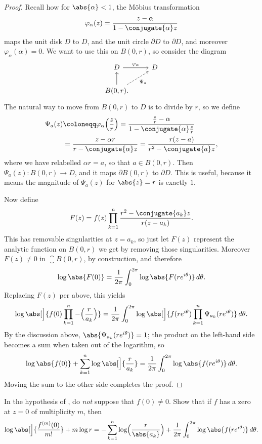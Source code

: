 \begin{proof}
	Recall how for $\abs{\alpha} < 1$, the Möbius transformation
	\[
		\varphi_\alpha(z) = \frac{z - \alpha}{1 - \conjugate{\alpha} z}
	\]
	maps the unit disk $D$ to $D$, and the unit circle $\partial D$ to $\partial D$, and moreover $\varphi_\alpha(\alpha) = 0$.
	We want to use this on $B(0, r)$, so consider the diagram
	\[
		\begin{tikzcd}
			D \arrow[r, "\varphi_\alpha"] & D \\
			B(0, r). \arrow[u] \arrow[ur, dashed, "\Psi_a"']
		\end{tikzcd}
	\]
	The natural way to move from $B(0, r)$ to $D$ is to divide by $r$, so we define
	\begin{align*}
		\Psi_a(z) &\coloneqq \varphi_\alpha\Bigl(\frac{z}{r}\Bigr) = \frac{\frac{z}{r} - \alpha}{1 - \conjugate{\alpha} \frac{z}{r}} \\
		&= \frac{z - \alpha r}{r - \conjugate{\alpha} z} = \frac{r(z - a)}{r^2 - \conjugate{a} z},
	\end{align*}
	where we have relabelled $\alpha r = a$, so that $a \in B(0, r)$.
	Then $\Psi_a(z) \colon B(0, r) \to D$, and it maps $\partial B(0, r)$ to $\partial D$.
	This is useful, because it means the magnitude of $\Psi_a(z)$ for $\abs{z} = r$ is exactly $1$.

	Now define
	\[
		F(z) = f(z) \prod_{k = 1}^n \frac{r^2 - \conjugate{a_k} z}{r(z - a_k)}.
	\]
	This has removable singularities at $z = a_k$, so just let $F(z)$ represent the analytic function on $B(0, r)$ we get by removing those singularities.
	Moreover $F(z) \neq 0$ in $\closure{B(0, r)}$, by construction, and therefore
	\[
		\log \abs{F(0)} = \frac{1}{2 \pi} \int_0^{2 \pi} \log \abs{F(r e^{i \theta})} \, d \theta.
	\]
	Replacing $F(z)$ per above, this yields
	\[
		\log \abs[\Big]{f(0) \prod_{k = 1}^n - \Bigl( \frac{r}{a_k} \Bigr)} = \frac{1}{2 \pi} \int_0^{2 \pi} \log \abs[\Big]{f(r e^{i \theta}) \prod_{k = 1}^n \Psi_{a_k}(r e^{i \theta}) } \, d \theta.
	\]
	By the discussion above, $\abs{\Psi_{a_k}(r e^{i \theta})} = 1$; the product on the left-hand side becomes a sum when taken out of the logarithm, so
	\[
		\log \abs{f(0)} + \sum_{k = 1}^n \log \abs[\Big]{\frac{r}{a_k}} = \frac{1}{2 \pi} \int_0^{2 \pi} \log\abs{f(r e^{i \theta})} \, d \theta.
	\]
	Moving the sum to the other side completes the proof.
\end{proof}

\begin{exercise}
	In the hypothesis of , do \emph{not} suppose that $f(0) \neq 0$.
	Show that if $f$ has a zero at $z = 0$ of multiplicity $m$, then
	\[
		\log\abs[\Big]{\frac{f^{(m)}(0)}{m!}} + m \log r = - \sum_{k = 1}^n \log \Bigl ( \frac{r}{\abs{a_k}} \Bigr) + \frac{1}{2 \pi} \int_0^{2 \pi} \log \abs{f(r e^{i \theta})} \, d \theta. \qedhere
	\]
\end{exercise}

